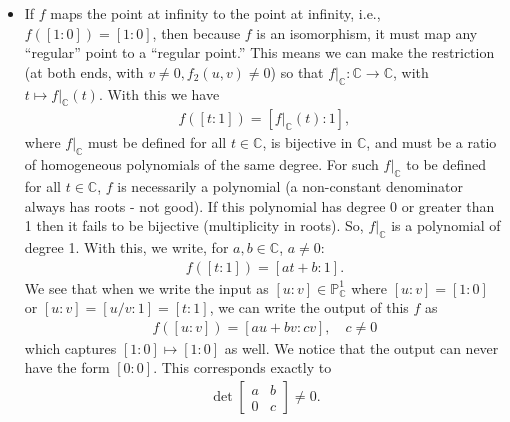 \documentclass[12pt]{article}
\newcommand{\C}{\mathbb{C}}
\begin{document}
\begin{itemize}
\item If $f$ maps the point at infinity to the point at infinity, i.e., $f([1:0]) = [1:0]$, then because $f$ is an isomorphism, it must map any ``regular'' point to a ``regular point.'' This means we can make the restriction (at both ends, with $v\neq 0, f_2(u,v)\neq 0$) so that $f\vert_\C : \C \to \C$, with $t\mapsto f\vert_\C(t)$. With this we have
\begin{align*}
f([t:1]) = [f\vert_\C(t) : 1],
\end{align*}
where $f\vert_\C$ must be defined for all $t\in \C$, is bijective in $\C$, and must be a ratio of homogeneous polynomials of the same degree. For such $f\vert_\C$ to be defined for all $t\in \C$, $f$ is necessarily a polynomial (a non-constant denominator always has roots - not good). If this polynomial has degree 0 or greater than 1 then it fails to be bijective (multiplicity in roots). So, $f\vert_\C$ is a polynomial of degree 1. With this, we write, for $a, b \in \C$, $a \neq 0$:
\begin{align*}
f([t:1]) = [a t + b : 1].
\end{align*}
We see that when we write the input as $[u:v] \in \mathbb{P}^1_\C$ where $[u:v] = [1:0]$ or $[u:v] = [u/v:1] = [t:1]$, we can write the output of this $f$ as
\begin{align*}
f([u:v]) = [au+ bv : cv], \quad c\neq 0
\end{align*}
which captures $[1:0]\mapsto [1:0]$ as well. We notice that the output can never have the form $[0:0]$. This corresponds exactly to 
\begin{align*}
\det\begin{bmatrix}
a & b \\ 0 & c
\end{bmatrix} \neq 0.
\end{align*}





\end{itemize}
\end{document}
